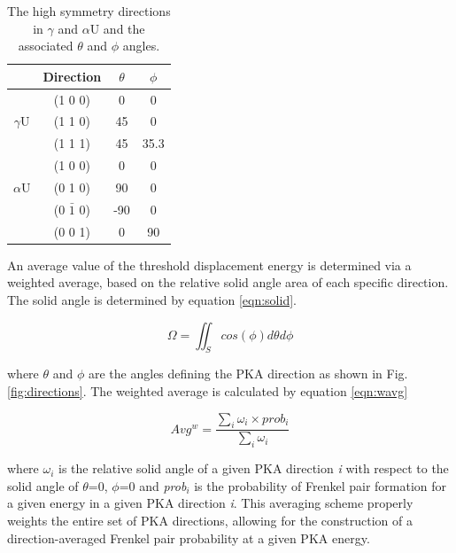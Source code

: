 \documentclass[review]{elsarticle}
\begin{document}
\begin{table}[h]
\caption{The high symmetry directions in $\gamma$ and $\alpha$U and the associated $\theta$ and $\phi$ angles.} \label{tab:dirs}
\begin{center}
\begin{tabular}{|c|c|c|c|}
	\hline
	& Direction & $\theta$ & $\phi$ \\
	 \hline
	 & (1 0 0) & 0 & 0 \\
	$\gamma$U & (1 1 0) & 45 & 0 \\
	& (1 1 1) & 45 & 35.3 \\
	 \hline
	 	 & (1 0 0) & 0 & 0 \\
	$\alpha$U & (0 1 0) & 90 & 0 \\
	& (0 $\bar{1}$ 0) & -90 & 0 \\
	& (0 0 1) & 0 & 90 \\
	 \hline
\end{tabular}
\end{center}
\label{default}
\end{table}

\FloatBarrier

An average value of the threshold displacement energy is determined via a weighted average, based on the relative solid angle area of each specific direction. The solid angle is determined by equation \ref{eqn:solid}. 

\begin{equation}
\label{eqn:solid}
\Omega = \iint_S cos(\phi) d\theta d\phi
\end{equation} 

where $\theta$ and $\phi$ are the angles defining the PKA direction as shown in Fig. \ref{fig:directions}. The weighted average is calculated by equation \ref{eqn:wavg}

\begin{equation}
\label{eqn:wavg}
Avg^{w} = \frac{\sum_i \omega_{i} \times prob_{i}}{\sum_i \omega_{i} }
\end{equation} 

where $\omega_{i}$ is the relative solid angle of a given PKA direction \textit{i} with respect to the solid angle of $\theta$=0, $\phi$=0 and \textit{prob$_{i}$} is the probability of Frenkel pair formation for a given energy in a given PKA direction \textit{i}. This averaging scheme properly weights the entire set of PKA directions, allowing for the construction of a direction-averaged Frenkel pair probability at a given PKA energy.
\end{document}
